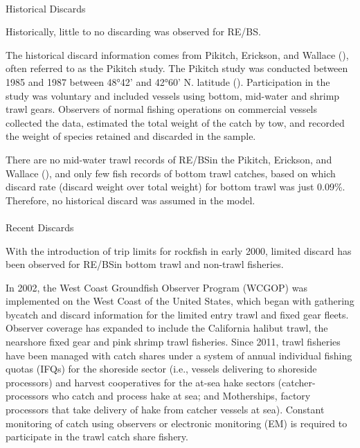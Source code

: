 \documentclass[
]{scrartcl}
\makeatletter
\let\oldparagraph\paragraph
\renewcommand{\paragraph}{
    \@ifstar
      \xxxParagraphStar
      \xxxParagraphNoStar
  }
\newcommand{\xxxParagraphStar}[1]{\oldparagraph*{#1}\mbox{}}
\newcommand{\xxxParagraphNoStar}[1]{\oldparagraph{#1}\mbox{}}
\makeatother
\begin{document}
\paragraph{Historical Discards}\label{sec-historical_discard}

Historically, little to no discarding was observed for RE/BS.

The historical discard information comes from Pikitch, Erickson, and
Wallace (), often referred
to as the Pikitch study. The Pikitch study was conducted between 1985
and 1987 between 48°42' and 42°60' N. latitude
(). Participation in the study was voluntary and included vessels
using bottom, mid-water and shrimp trawl gears. Observers of normal
fishing operations on commercial vessels collected the data, estimated
the total weight of the catch by tow, and recorded the weight of species
retained and discarded in the sample.

There are no mid-water trawl records of RE/BSin the Pikitch, Erickson,
and Wallace (), and only few
fish records of bottom trawl catches, based on which discard rate
(discard weight over total weight) for bottom trawl was just 0.09\%.
Therefore, no historical discard was assumed in the model.

\paragraph{Recent Discards}\label{sec-recent_discard}

With the introduction of trip limits for rockfish in early 2000, limited
discard has been observed for RE/BSin bottom trawl and non-trawl
fisheries.

In 2002, the West Coast Groundfish Observer Program (WCGOP) was
implemented on the West Coast of the United States, which began with
gathering bycatch and discard information for the limited entry trawl
and fixed gear fleets. Observer coverage has expanded to include the
California halibut trawl, the nearshore fixed gear and pink shrimp trawl
fisheries. Since 2011, trawl fisheries have been managed with catch
shares under a system of annual individual fishing quotas (IFQs) for the
shoreside sector (i.e., vessels delivering to shoreside processors) and
harvest cooperatives for the at-sea hake sectors (catcher-processors who
catch and process hake at sea; and Motherships, factory processors that
take delivery of hake from catcher vessels at sea). Constant monitoring
of catch using observers or electronic monitoring (EM) is required to
participate in the trawl catch share fishery.
\end{document}

